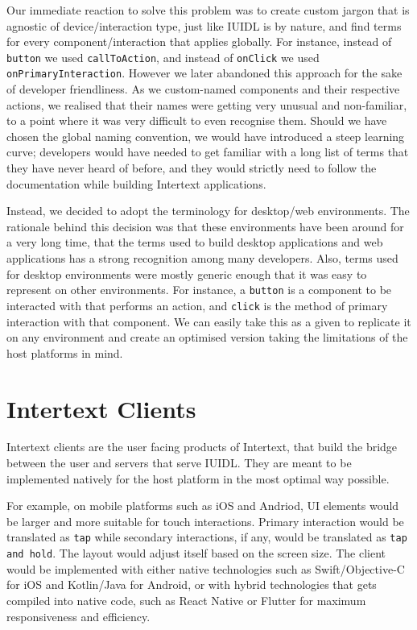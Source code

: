 Our immediate reaction to solve this problem was to create custom jargon that is agnostic of device/interaction type, just like IUIDL is by nature, and find terms for every component/interaction that applies globally. For instance, instead of \texttt{button} we used \texttt{callToAction}, and instead of \texttt{onClick} we used \texttt{onPrimaryInteraction}. However we later abandoned this approach for the sake of developer friendliness. As we custom-named components and their respective actions, we realised that their names were getting very unusual and non-familiar, to a point where it was very difficult to even recognise them. Should we have chosen the global naming convention, we would have introduced a steep learning curve; developers would have needed to get familiar with a long list of terms that they have never heard of before, and they would strictly need to follow the documentation while building Intertext applications.

Instead, we decided to adopt the terminology for desktop/web environments. The rationale behind this decision was that these environments have been around for a very long time, that the terms used to build desktop applications and web applications has a strong recognition among many developers. Also, terms used for desktop environments were mostly generic enough that it was easy to represent on other environments. For instance, a \texttt{button} is a component to be interacted with that performs an action, and \texttt{click} is the method of primary interaction with that component. We can easily take this as a given to replicate it on any environment and create an optimised version taking the limitations of the host platforms in mind.

\section{Intertext Clients} \label{intertextClients}

Intertext clients are the user facing products of Intertext, that build the bridge between the user and servers that serve IUIDL. They are meant to be implemented natively for the host platform in the most optimal way possible. 

For example, on mobile platforms such as iOS and Andriod, UI elements would be larger and more suitable for touch interactions. Primary interaction would be translated as \texttt{tap} while secondary interactions, if any, would be translated as \texttt{tap and hold}. The layout would adjust itself based on the screen size. The client would be implemented with either native technologies such as Swift/Objective-C for iOS and Kotlin/Java for Android, or with hybrid technologies that gets compiled into native code, such as React Native or Flutter for maximum responsiveness and efficiency. 

